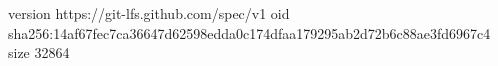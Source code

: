 version https://git-lfs.github.com/spec/v1
oid sha256:14af67fec7ca36647d62598edda0c174dfaa179295ab2d72b6c88ae3fd6967c4
size 32864
